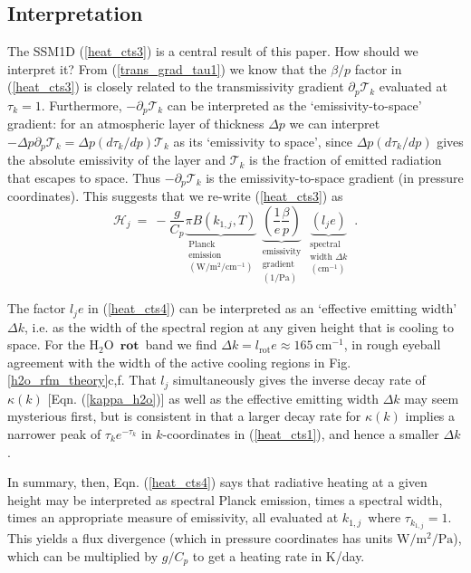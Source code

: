 \documentclass{ametsoc}
\newcommand{\beqn}{\begin{equation}}
\newcommand{\eeqn}{\end{equation}}
\newcommand{\eqnref}[1]{(\ref{#1})}
\newcommand{\Wmsq}{\ensuremath{\mathrm{W/m^2}}}
\newcommand{\cminverse}{\ensuremath{\mathrm{cm^{-1}}}}
\newcommand{\Pa}{\ensuremath{\mathrm{Pa}}}
\newcommand{\ppp}{\ensuremath{\partial_p}}
\newcommand{\Cp}{\ensuremath{C_p}}
\newcommand{\htwo}{\ensuremath{\mathrm{H_2O}}}
\newcommand{\trans}{\ensuremath{\mathcal{T}}}
\newcommand{\ch}{\ensuremath{\mathcal{H}}}
\newcommand{\lj}{\ensuremath{l_j}}
\newcommand{\tauk}{\ensuremath{\tau_k}}
\newcommand{\konej}{\ensuremath{k_{1,j}}}
\newcommand{\lrot}{\ensuremath{l_\mathrm{rot}}}
\newcommand{\rot}{\ensuremath{\textbf{rot}}}
\begin{document}
\subsection{Interpretation} \label{sec_interp}
The SSM1D  \eqnref{heat_cts3} is a central result of this paper. How should we interpret it? From \eqnref{trans_grad_tau1} we know that the $\beta/p$ factor in \eqnref{heat_cts3} is closely related to the transmissivity gradient $\ppp \trans_k$ evaluated at $\tauk=1$. Furthermore, $-\ppp \trans_k$ can be interpreted as  the `emissivity-to-space' gradient: for an atmospheric layer of thickness $\Delta p$ we can interpret $-\Delta p\ppp \trans_k  = \Delta p (d \tauk/dp)\trans_k$ as its `emissivity to space', since $\Delta p(d \tauk/dp)$ gives the absolute  emissivity of the layer and $\trans_k$ is the fraction of emitted radiation that escapes to space. Thus $-\ppp \trans_k$ is the emissivity-to-space gradient (in pressure coordinates). This suggests that we re-write \eqnref{heat_cts3} as 
	\beqn
		\ch_j \ = \ -\frac{g}{\Cp} \underbrace{\pi B(\konej,T)}_{\substack{ \text{Planck } \\ \text{emission}\\(\Wmsq/\cminverse)}}\,
					   \underbrace{\left(\frac{1}{e}\frac{\beta}{p}\right)}_{\substack{ \text{emissivity} \\ \text{gradient}  \\ (1/\Pa) } } \,
					   \underbrace{(\lj e)}_{\substack{  \text{spectral} \\ \text{width $\Delta k$} \\ (\cminverse) } }    \; .
		\label{heat_cts4}
	\eeqn

The factor $\lj e$ in \eqnref{heat_cts4} can be interpreted as an `effective emitting width' $\Delta k$, i.e. as the  width of the spectral region at any given height that is cooling to space. For the \htwo\ \rot\ band we find $\Delta k = \lrot e \approx  165\ \cminverse$,  in rough eyeball agreement with the width of the active cooling regions in Fig. \ref{h2o_rfm_theory}c,f. That $\lj$ simultaneously gives the inverse decay rate of $\kappa(k)$ [Eqn. \eqnref{kappa_h2o}] as well as the effective emitting width $\Delta k$ may seem mysterious first, but is consistent in that a larger decay rate for $\kappa(k)$ implies a narrower peak of $\tauk e^{-\tauk}$ in $k$-coordinates in \eqnref{heat_cts1}, and hence a smaller $\Delta k$.

In summary, then, Eqn.  \eqnref{heat_cts4} says that radiative heating at a given height may be interpreted as spectral Planck emission, times a spectral width,  times an appropriate measure of emissivity,  all evaluated at \konej\ where $\tau_{\konej}=1$. This yields a flux divergence (which in pressure coordinates has units $\Wmsq/\Pa$), which can be multiplied by $g/\Cp$ to get a heating rate in K/day.
 
\end{document}
